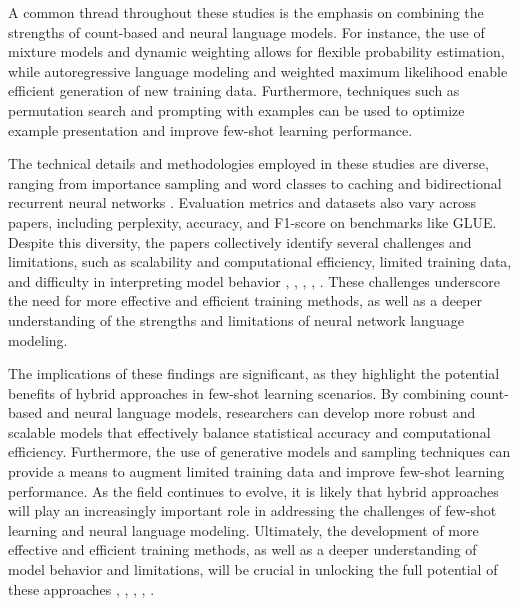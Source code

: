 \documentclass[conference]{IEEEtran}
\begin{document}
A common thread throughout these studies is the emphasis on combining the strengths of count-based and neural language models. For instance, the use of mixture models and dynamic weighting \cite{b2} allows for flexible probability estimation, while autoregressive language modeling and weighted maximum likelihood \cite{b3} enable efficient generation of new training data. Furthermore, techniques such as permutation search and prompting with examples \cite{b4} can be used to optimize example presentation and improve few-shot learning performance.

The technical details and methodologies employed in these studies are diverse, ranging from importance sampling and word classes to caching and bidirectional recurrent neural networks \cite{b5}. Evaluation metrics and datasets also vary across papers, including perplexity, accuracy, and F1-score on benchmarks like GLUE. Despite this diversity, the papers collectively identify several challenges and limitations, such as scalability and computational efficiency, limited training data, and difficulty in interpreting model behavior \cite{b1}, \cite{b2}, \cite{b3}, \cite{b4}, \cite{b5}. These challenges underscore the need for more effective and efficient training methods, as well as a deeper understanding of the strengths and limitations of neural network language modeling.

The implications of these findings are significant, as they highlight the potential benefits of hybrid approaches in few-shot learning scenarios. By combining count-based and neural language models, researchers can develop more robust and scalable models that effectively balance statistical accuracy and computational efficiency. Furthermore, the use of generative models and sampling techniques can provide a means to augment limited training data and improve few-shot learning performance. As the field continues to evolve, it is likely that hybrid approaches will play an increasingly important role in addressing the challenges of few-shot learning and neural language modeling. Ultimately, the development of more effective and efficient training methods, as well as a deeper understanding of model behavior and limitations, will be crucial in unlocking the full potential of these approaches \cite{b1}, \cite{b2}, \cite{b3}, \cite{b4}, \cite{b5}.
\end{document}
